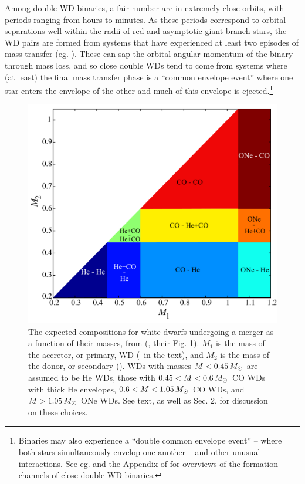 
Among double WD binaries, a fair number are in extremely close orbits, with periods ranging from hours to minutes.  As these periods correspond to orbital separations well within the radii of red and asymptotic giant branch stars, the WD pairs are formed from systems that have experienced at least two episodes of mass transfer (eg. \citealt{nele+01a, toonnp12, toon+14}).  These can sap the orbital angular momentum of the binary through mass loss, and so close double WDs tend to come from systems where (at least) the final mass transfer phase is a ``common envelope event'' where one star enters the envelope of the other and much of this envelope is ejected.\footnote{Binaries may also experience a ``double common envelope event'' -- where both stars simultaneously envelop one another -- and other unusual interactions.  See eg. \cite{toonnp12} and the Appendix of \cite{toon+14} for overviews of the formation channels of close double WD binaries.}

\begin{figure}
\centering
\includegraphics[width=0.6\hsize]{introduction/figures/dan+12_wdbinmass.pdf}
\caption{The expected compositions for white dwarfs undergoing a merger as a function of their masses, from \citeauthor{dan+12} (\citeyear{dan+12}, their Fig. 1).  $M_1$ is the mass of the accretor, or primary, WD (\Ma\ in the text), and $M_2$ is the mass of the donor, or secondary (\Md).  WDs with masses $M<0.45\,\Msun$ are assumed to be He WDs, those with $0.45 < M < 0.6\,\Msun$ CO WDs with thick He envelopes, $0.6 < M < 1.05\,\Msun$ CO WDs, and $M>1.05\,\Msun$ ONe WDs.  See text, as well as \cite{dan+12} Sec. 2, for discussion on these choices.}
\label{fig:c1_wdbinarymasses}
\end{figure}

